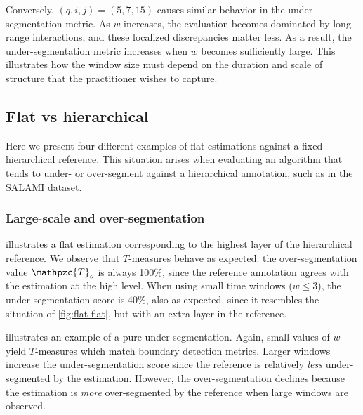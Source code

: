 \documentclass{article}
\def\shag{\ensuremath{\mathpzc{T}}}
\begin{document}
Conversely, $(q,i,j) = (5, 7, 15)$ causes similar behavior in the under-segmentation metric.
As $w$ increases, the evaluation becomes dominated by long-range interactions, and these localized discrepancies matter less.
As a result, the under-segmentation metric increases when $w$ becomes sufficiently large.
This illustrates how the window size must depend on the duration and scale of structure that the practitioner wishes to capture. 

\subsection{Flat vs hierarchical}

Here we present four different examples of flat estimations against a fixed hierarchical reference.
This situation arises when evaluating an algorithm that tends to under- or over-segment against a
hierarchical annotation, such as in the SALAMI dataset.

\subsubsection{Large-scale and over-segmentation}

 illustrates a flat estimation corresponding to the highest layer of the hierarchical reference.
We observe that $T$-measures behave as expected: the over-segmentation value $\shag_o$ is always 100\%, since the reference annotation agrees with the estimation at the high level.
When using small time windows ($w \leq 3$), the under-segmentation score is 40\%, also as expected, since it
resembles the situation of \cref{fig:flat-flat}, but with an extra layer in the reference.

 illustrates an example of a pure under-segmentation.  Again, small values of $w$
yield $T$-measures which match boundary detection metrics.  Larger windows increase the
under-segmentation score since the reference is relatively \emph{less} under-segmented by the estimation.
However, the over-segmentation declines because the estimation is \emph{more} over-segmented by the
reference when large windows are observed.
\end{document}
